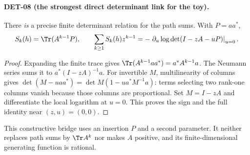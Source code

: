 \paragraph{DET-08 (the strongest direct determinant link for the toy).}
There \emph{is} a precise finite determinant relation for the path sums. With $P=aa^*$,
\[
 S_k(h)=\Tr(A^{k-1}P),\qquad
 \sum_{k\ge1}S_k(h)z^{k-1}
 =-\left.\partial_u\log\det(I-zA-uP)\right|_{u=0}.
\]
\begin{proof}
Expanding the finite trace gives $\Tr(A^{k-1}aa^*)=a^*A^{k-1}a$. The Neumann series sums it to $a^*(I-zA)^{-1}a$. For invertible $M$, multilinearity of columns gives
$\det(M-uaa^*)=\det M(1-u a^*M^{-1}a)$: terms selecting two rank-one columns vanish because those columns are proportional. Set $M=I-zA$ and differentiate the local logarithm at $u=0$. This proves the sign and the full identity near $(z,u)=(0,0)$.
\end{proof}
This constructive bridge uses an insertion $P$ and a second parameter. It neither replaces path sums by $\Tr A^k$ nor makes $A$ positive, and its finite-dimensional generating function is rational.
